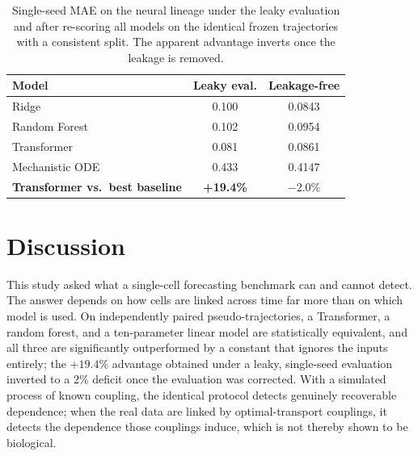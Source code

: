 \documentclass[pdflatex,sn-mathphys-num]{sn-jnl}
\theoremstyle{thmstyleone}%
\theoremstyle{thmstyletwo}%
\theoremstyle{thmstylethree}%
\begin{document}
\begin{table}[!htbp]
\centering
\caption{\scriptsize Single-seed MAE on the neural lineage under the leaky evaluation and after re-scoring all models on the identical frozen trajectories with a consistent split. The apparent advantage inverts once the leakage is removed.}
\label{tab:leakage}
\vspace{-2mm}
\scriptsize
\setlength{\tabcolsep}{6pt}
\begin{tabular}{lcc}
\hline \toprule
\textbf{Model} & \textbf{Leaky eval.} & \textbf{Leakage-free} \\
\hline
Ridge & 0.100 & 0.0843 \\
Random Forest & 0.102 & 0.0954 \\
Transformer & 0.081 & 0.0861 \\
Mechanistic ODE & 0.433 & 0.4147 \\
\hline
\textbf{Transformer vs.\ best baseline} & \textbf{+19.4\%} & \textbf{$-2.0\%$} \\
\hline \toprule
\end{tabular}
\vspace{-3mm}
\end{table}

\section{\textbf{Discussion}}
\label{sec:discussion}

This study asked what a single-cell forecasting benchmark can and cannot detect. The answer depends on how cells are linked across time far more than on which model is used. On independently paired pseudo-trajectories, a Transformer, a random forest, and a ten-parameter linear model are statistically equivalent, and all three are significantly outperformed by a constant that ignores the inputs entirely; the $+19.4\%$ advantage obtained under a leaky, single-seed evaluation inverted to a $2\%$ deficit once the evaluation was corrected. With a simulated process of known coupling, the identical protocol detects genuinely recoverable dependence; when the real data are linked by optimal-transport couplings, it detects the dependence those couplings induce, which is not thereby shown to be biological.
\end{document}

